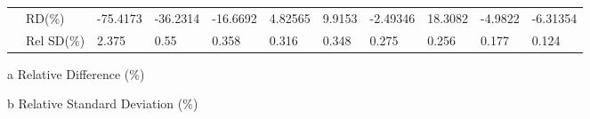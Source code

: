 \documentclass[letterpaper,12pt]{article}
\begin{document}
\begin{table}[H]
\begin{adjustbox}{width=\columnwidth,center}
\begin{threeparttable}
\begin{tabular}{lllllllllll}
                             & RD(\%)\tnote{a}                                         & -75.4173        & -36.2314        & -16.6692        & 4.82565        & 9.9153        & -2.49346        & 18.3082        & -4.9822        & -6.31354        \\ 
                             & Rel SD(\%)\tnote{b}                                          & 2.375        & 0.55        & 0.358        & 0.316        & 0.348        & 0.275        & 0.256        & 0.177        & 0.124        \\ \hline
\end{tabular} 
\begin{tablenotes}\footnotesize
\item[a] Relative Difference (\%)
\item[b] Relative Standard Deviation (\%)
\end{tablenotes}
\end{threeparttable}
\end{adjustbox}
\label{CrossFromKidney}
\end{table}
\end{document}
